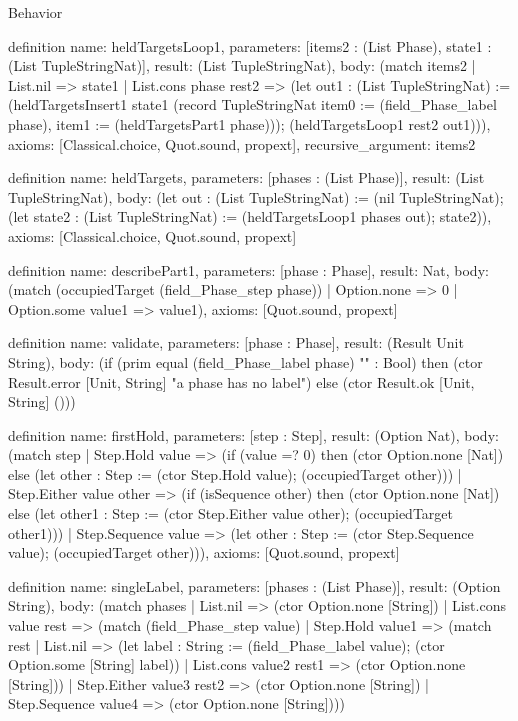\begin{lexlean}{Behavior}
\begin{semanticmodule}
definition{
  name: heldTargetsLoop1,
  parameters: [items2 : (List Phase), state1 : (List TupleStringNat)],
  result: (List TupleStringNat),
  body: (match items2
    | List.nil => state1
    | List.cons phase rest2 => (let out1 : (List TupleStringNat) := (heldTargetsInsert1 state1 (record TupleStringNat {item0 := (field_Phase_label phase), item1 := (heldTargetsPart1 phase)})); (heldTargetsLoop1 rest2 out1))),
  axioms: [Classical.choice, Quot.sound, propext],
  recursive_argument: items2
}

definition{
  name: heldTargets,
  parameters: [phases : (List Phase)],
  result: (List TupleStringNat),
  body: (let out : (List TupleStringNat) := (nil TupleStringNat); (let state2 : (List TupleStringNat) := (heldTargetsLoop1 phases out); state2)),
  axioms: [Classical.choice, Quot.sound, propext]
}

definition{
  name: describePart1,
  parameters: [phase : Phase],
  result: Nat,
  body: (match (occupiedTarget (field_Phase_step phase))
    | Option.none => 0
    | Option.some value1 => value1),
  axioms: [Quot.sound, propext]
}

definition{
  name: validate,
  parameters: [phase : Phase],
  result: (Result Unit String),
  body: (if (prim equal (field_Phase_label phase) "" : Bool) then (ctor Result.error [Unit, String] "a phase has no label") else (ctor Result.ok [Unit, String] ()))
}

definition{
  name: firstHold,
  parameters: [step : Step],
  result: (Option Nat),
  body: (match step
    | Step.Hold value => (if (value =? 0) then (ctor Option.none [Nat]) else (let other : Step := (ctor Step.Hold value); (occupiedTarget other)))
    | Step.Either value other => (if (isSequence other) then (ctor Option.none [Nat]) else (let other1 : Step := (ctor Step.Either value other); (occupiedTarget other1)))
    | Step.Sequence value => (let other : Step := (ctor Step.Sequence value); (occupiedTarget other))),
  axioms: [Quot.sound, propext]
}

definition{
  name: singleLabel,
  parameters: [phases : (List Phase)],
  result: (Option String),
  body: (match phases
    | List.nil => (ctor Option.none [String])
    | List.cons value rest => (match (field_Phase_step value)
      | Step.Hold value1 => (match rest
        | List.nil => (let label : String := (field_Phase_label value); (ctor Option.some [String] label))
        | List.cons value2 rest1 => (ctor Option.none [String]))
      | Step.Either value3 rest2 => (ctor Option.none [String])
      | Step.Sequence value4 => (ctor Option.none [String])))
}


\end{semanticmodule}
\end{lexlean}
